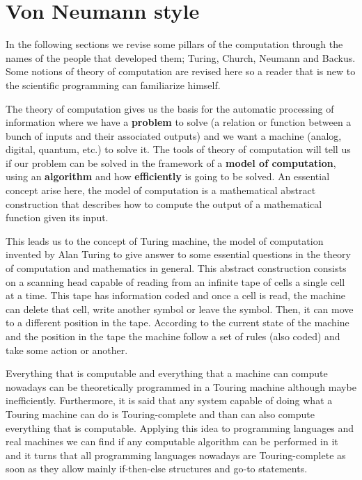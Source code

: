  
\newpage   
\section{Von Neumann style} 


In the following sections we revise some pillars of the computation through the names of the people 
that developed them; Turing, Church, Neumann and Backus. 
Some notions of theory of computation are revised here so a reader that is new 
to the scientific programming can familiarize himself. 

The theory of computation gives us the basis for the automatic processing of information where we have a \textbf{problem} to solve (a 
relation or function between a bunch of inputs and their associated outputs) and we want a machine (analog, digital, quantum, etc.) to solve it. 
The tools of theory of computation will tell us if our problem can be solved in the framework of a \textbf{model of computation}, using an 
\textbf{algorithm} and how \textbf{efficiently} is going to be solved. 
An essential concept arise here, the model of computation is a mathematical abstract construction that describes how to compute the output of 
a mathematical function given its input. 

This leads us to the concept of Turing machine, the model of computation invented by Alan Turing to give answer to some essential questions 
in the theory of computation and mathematics in general. This abstract construction consists on a scanning head capable of reading from an 
infinite tape of cells a single cell at a time. This tape has information coded and once a cell is read, the machine can delete that cell, 
write another symbol or leave the symbol. Then, it can move to a different position in the tape. According to the current state of the 
machine and the position in the tape the machine follow a set of rules (also coded) and take some action or another. 

Everything that is computable and everything that a machine can compute nowadays can be theoretically programmed in a Touring machine 
although maybe inefficiently. Furthermore, it is said that any system capable of doing what a Touring machine can do is Touring-complete and 
than can also compute everything that is computable. Applying this idea to programming languages and real machines we can find if any 
computable algorithm can be performed in it and it turns that all programming languages nowadays are Touring-complete as soon as they allow 
mainly if-then-else structures and go-to statements. 

